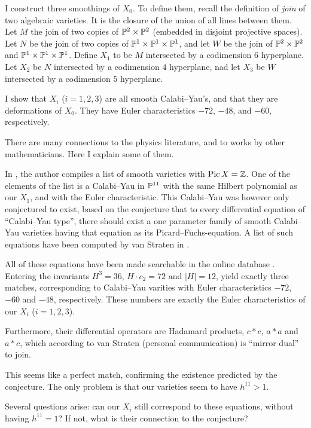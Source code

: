 I construct three smoothings of $X_0$. To define them, recall the definition of \emph{join} of two algebraic varieties. It is the closure of the union of all lines between them. Let $M$ the join of two copies of $\P^2 \times \P^2$ (embedded in disjoint projective spaces). Let $N$ be the join of two copies of $\P^1 \times \P^1 \times \P^1$, and let $W$ be the join of $\P^2 \times \P^2$ and $\P^1 \times \P^1 \times \P^1$. Define $X_1$ to be $M$ intersected by a codimension $6$ hyperplane. Let $X_2$ be $N$ intersected by a codimension $4$ hyperplane, nad let $X_3$ be $W$ intersected by a codimension $5$ hyperplane. 

I show that $X_i$ ($i=1,2,3$) are all smooth Calabi--Yau's, and that they are deformations of $X_0$. They have Euler characteristics $-72$, $-48$, and $-60$, respectively. 

There are many connections to the physics literature, and to works by other mathematicians. Here I explain some of them.

In \cite{kapustka_delpezzo}, the author compiles a list of smooth \CY varieties with $\Pic X = \Z$. One of the elements of the list is a Calabi--Yau in $\P^{11}$ with the same Hilbert polynomial as our $X_1$, and with the Euler characteristic. This Calabi--Yau was however only conjectured to exist, based on the conjecture that to every differential equation of ``Calabi--Yau type'', there should exist a one parameter family of smooth Calabi--Yau varieties having that equation as its Picard--Fuchs-equation. A list of such equations have been computed by van Straten in \cite{monodromy_straten}.

All of these equations have been made searchable in the online database \cite{cy_database}. Entering the invariants $H^3=36$, $H \cdot c_2 = 72$ and $|H|=12$, yield exactly three matches, corresponding to Calabi--Yau varities with Euler characteristics $-72$, $-60$ and $-48$, respectively. These numbers are exactly the Euler characteristics of our $X_i$ ($i=1,2,3$).

Furthermore, their differential operators are Hadamard products, $c \ast c$, $a \ast a$ and $a \ast c$, which according to van Straten (personal communication) is ``mirror dual'' to join.

This seems like a perfect match, confirming the existence predicted by the conjecture. The only problem is that our varieties seem to have $h^{11} > 1$.

Several questions arise: can our $X_i$ still correspond to these equations, without having $h^{11}=1$? If not, what is their connection to the conjecture?

